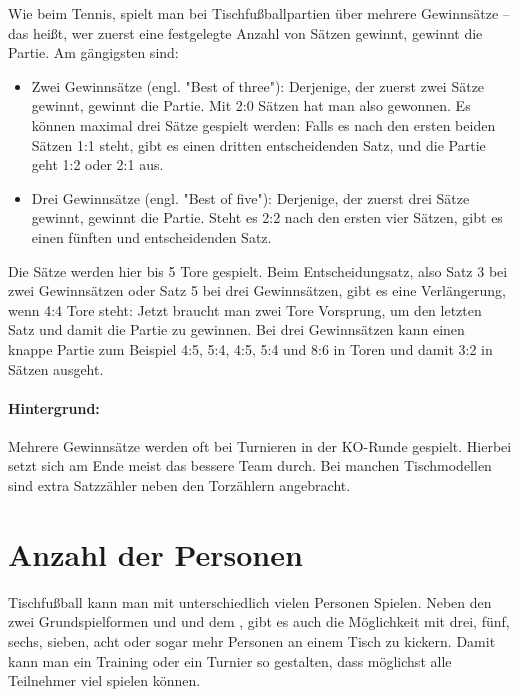 Wie beim Tennis, spielt man bei Tischfußballpartien über mehrere Gewinnsätze -- das heißt, wer zuerst eine festgelegte Anzahl von Sätzen gewinnt, gewinnt die Partie. Am gängigsten sind:
\begin{itemize}
\item Zwei Gewinnsätze (engl. "Best of three"): Derjenige, der zuerst zwei Sätze gewinnt, gewinnt die Partie. Mit 2:0 Sätzen hat man also gewonnen. 
Es können maximal drei Sätze gespielt werden: Falls es nach den ersten beiden Sätzen 1:1 steht, gibt es einen dritten entscheidenden Satz, und die Partie geht 1:2 oder 2:1 aus. 
\item Drei Gewinnsätze (engl. "Best of five"): Derjenige, der zuerst drei Sätze gewinnt, gewinnt die Partie. Steht es 2:2 nach den ersten vier Sätzen, gibt es einen fünften und entscheidenden Satz. 
\end{itemize}
Die Sätze werden hier bis 5 Tore gespielt. Beim Entscheidungsatz, also Satz 3 bei zwei Gewinnsätzen oder Satz 5 bei drei Gewinnsätzen, gibt es eine Verlängerung, wenn 4:4 Tore steht: Jetzt braucht man zwei Tore Vorsprung, um den letzten Satz und damit die Partie zu gewinnen. Bei drei Gewinnsätzen kann einen knappe Partie zum Beispiel 4:5, 5:4, 4:5, 5:4 und 8:6 in Toren und damit 3:2 in Sätzen ausgeht. 

\paragraph{Hintergrund:}
Mehrere Gewinnsätze werden oft bei Turnieren in der KO-Runde gespielt. Hierbei setzt sich am Ende meist das bessere Team durch. Bei manchen Tischmodellen sind extra Satzzähler neben den Torzählern angebracht. 




\section{Anzahl der Personen}
\label{spielformen:npersonen}

Tischfußball kann man mit unterschiedlich vielen Personen Spielen. 
Neben den zwei Grundspielformen  und  und dem , gibt es auch die Möglichkeit mit drei, fünf, sechs, sieben, acht oder sogar mehr Personen an einem Tisch zu kickern.
Damit kann man ein Training oder ein Turnier so gestalten, dass möglichst alle Teilnehmer viel spielen können. 


